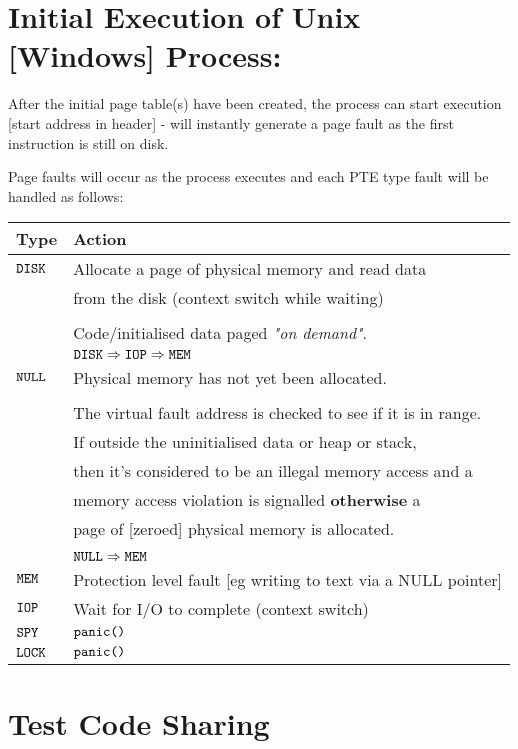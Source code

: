 \documentclass[a4paper,12pt]{article}
\begin{document}
\section*{Initial Execution of Unix [Windows] Process:}

After the initial page table(s) have been created, the process can start
execution [start address in header] - will instantly generate a page
fault as the first instruction is still on disk.

Page faults will occur as the process executes and each PTE type fault
will be handled as follows:

\begin{tabular}{|l|l|}
\hline
Type				&	Action								\\
\hline
$\verb!DISK!$	&	Allocate a page of physical memory and read data \\
					&	from the disk (context switch while waiting) \\
					&		\\
					&	Code/initialised data paged \emph{"on demand"}.	\\
					&	$\verb!DISK! \Rightarrow \verb!IOP! \Rightarrow
					\verb!MEM!$ \\
\hline
$\verb!NULL!$	&	Physical memory has not yet been allocated. \\
					&		\\
					&	The virtual fault address is checked to see if it is in range. \\
					&	If outside the uninitialised data or heap or stack, \\
					&	then it's considered to be an illegal memory access and a \\
					&	memory access violation is signalled \textbf{otherwise} a \\
					&	page of [zeroed] physical memory is allocated. \\
					&		\\
					&	$\verb!NULL! \Rightarrow \verb!MEM!$ \\
\hline
$\verb!MEM!$	& Protection level fault [eg writing to text via a NULL pointer] \\
\hline
$\verb!IOP!$	&	Wait for I/O to complete (context switch)	\\
\hline
$\verb!SPY!$	&	$\verb!panic()!$	\\
\hline
$\verb!LOCK!$	&	$\verb!panic()!$	\\
\hline
\end{tabular}

\section*{Test Code Sharing}
\end{document}

